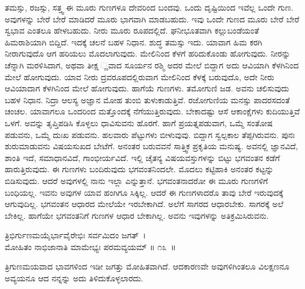 ತಮಸ್ಸು, ರಜಸ್ಸು, ಸತ್ತ್ವ ಈ ಮೂರು ಗುಣಗಳೂ ದೇವರಿಂದ ಬಂದವು. ಒಂದು ದೃಷ್ಟಿಯಿಂದ ಇವೆಲ್ಲ ಒಂದೇ ಗುಣ. ಅವುಗಳನ್ನು ಬೇರೆ ಬೇರೆ ಮಾಡಿದರೆ ಮೂರು ಭಾಗವಾಗಿ ಮಾಡಬಹುದು. ಇವು ಒಂದೇ ಗುಣದ ಮೂರು ಬೇರೆ ಬೇರೆ ಸ್ವಭಾವ ಎಂತಲೂ ಹೇಳಬಹುದು. ನೀರು ಮೂರು ರೂಪದಲ್ಲಿದೆ. ಘನೀಭೂತವಾಗಿ ಕಲ್ಲುಬಂಡೆಯಂತೆ ಹಿಮರಾಶಿಯಾಗಿ ಬಿದ್ದಿದೆ. ಇದಕ್ಕೆ ಚಲನೆ ಬಹಳ ನಿಧಾನ. ಶುದ್ಧ ತಮಸ್ಸು ಇದು. ಯಾವಾಗ ಹಿಮ ಕರಗಿ ನೀರಾಗುವುದೊ ಆಗ ಹರಿಯಲು ಮೊದಲಾಗುವುದು. ಮೇಲಿನಿಂದ ಕೆಳಗೆ ಹರಿದುಕೊಂಡು ಹೋಗುವುದು. ನೀರನ್ನು ಚೆನ್ನಾಗಿ ಮರಳಿಸಿದಾಗ, ಅಥವಾ ತೀಕ್ಷ ್ಣವಾದ ಸೂರ್ಯನ ರಶ್ಮಿ ಅದರ ಮೇಲೆ ಬಿದ್ದಾಗ ಅದು ಆವಿಯಾಗಿ ಕೆಳಗಿನಿಂದ ಮೇಲೆ ಹೋಗುವುದು. ಯಾವ ನೀರು ದ್ರವರೂಪದಲ್ಲಿರುವಾಗ ಮೇಲಿನಿಂದ ಕೆಳಕ್ಕೆ ಬರುವುದೊ, ಅದೇ ನೀರು ಆವಿಯಾದಾಗ ಕೆಳಗಿನಿಂದ ಮೇಲೆ ಹೋಗುವುದು. ಹಾಗೆಯೆ ಗುಣಗಳು. ತಮೋಗುಣಿ ಜಡ. ಅವನು ಚಲಿಸುವುದು ಬಹಳ ನಿಧಾನ. ನಿದ್ರಾ ಆಲಸ್ಯ ಅಜ್ಞಾನ ಮೋಹ ತುಂಬಿ ತುಳುಕಾಡುತ್ತಿವೆ. ರಜೋಗುಣಿಯ ಮನಸ್ಸು ಪಾದರಸದಂತೆ ಚಂಚಲ. ಯಾವಾಗಲೂ ಒಂದರಿಂದ ಮತ್ತೊಂದಕ್ಕೆ ನೆಗೆಯುತ್ತಿರುವುದು. ಬೇಕಾದಷ್ಟು ಆಸೆ ಆಕಾಂಕ್ಷೆಗಳು ಕುದಿಯುತ್ತಿವೆ ಒಳಗೆ. ಅವನ್ನು ತೃಪ್ತಿಪಡಿಸಿ ಕೊಳ್ಳಲು ಧಾವಿಸುವನು ಹೊರಗೆ. ಹಾಗೆ ಪ್ರಯತ್ನಪಡುವಾಗ, ಒಮ್ಮೆ ಸಂತೋಷ ಪಡುವನು, ಒಮ್ಮೆ ದುಃಖ ಪಡುವನು. ಹಲವಾರು ಪೆಟ್ಟುಗಳು ಬೀಳುವುವು. ಬಿದ್ದಾಗ ಸ್ವಲ್ಪಕಾಲ ತೆಪ್ಪಗಿರುವನು. ಪುನಃ ಶುರುಮಾಡುವನು ವಿಷಯಸುಖದ ಬೇಟೆಗೆ. ಅನಂತರ ಬರುವವನೆ ಸಾತ್ತ್ವಿಕ ಪ್ರಕೃತಿಯ ಮನುಷ್ಯ. ಅವನಲ್ಲಿ ಜ್ಞಾನವಿದೆ, ಶಾಂತಿ ಇದೆ, ಸಮಾಧಾನವಿದೆ, ಗಾಂಭೀರ್ಯವಿದೆ. ಇಲ್ಲಿ ಚೈತನ್ಯ ವಿಷಯವಸ್ತುಗಳನ್ನು ಬಿಟ್ಟು ಭಗವಂತನ ಕಡೆಗೆ ಹಾರುತ್ತಿರುವುದು. ಈ ಗುಣಗಳು ಬಂದಿರುವುದು ಭಗವಂತನಿಂದಲೇ. ಮೊದಲು ಕಟ್ಟಿಹಾಕಿ ಅನಂತರ ಕಟ್ಟನ್ನು ಬಿಡಿಸುವುದು. ಆದರೆ ಅವುಗಳಲ್ಲಿ ನಾನು ಇಲ್ಲಾ ಎನ್ನುತ್ತಾನೆ. ಭಗವಂತನಾದರೋ ಈ ಮೂರು ಗುಣಗಳಿಗೆ ಬಂಧಿಯಲ್ಲ. ಇವನು ಅವುಗಳ ಯಾವ ಹಂಗಿಗೂ ಸಿಕ್ಕಿಲ್ಲ. ಆದರೆ ಈ ಗುಣಗಳಾದರೊ ತಾವು ಬೇರೆ ಇರುವುದಕ್ಕೆ ಆಗುವುದಿಲ್ಲ. ಭಗವಂತನ ಆಧಾರದ ಮೇಲೆಯೇ ಇರಬೇಕಾಗಿದೆ. ಅಲೆಗೆ ಸಾಗರದ ಆಧಾರಬೇಕು. ಸಾಗರಕ್ಕೆ ಅಲೆ ಬೇಕಿಲ್ಲ. ಹಾಗೆಯೇ ಭಗವಂತನಿಗೆ ಗುಣಗಳ ಆಧಾರ ಬೇಕಾಗಿಲ್ಲ. ಅವನು ಇವುಗಳನ್ನು ಅತಿಕ್ರಮಿಸಿರುವನು.

\begin{shloka}
 ತ್ರಿಭಿರ್ಗುಣಮಯೈರ್ಭಾವೈರೇಭಿಃ ಸರ್ವಮಿದಂ ಜಗತ್~।\\ಮೋಹಿತಂ ನಾಭಿಜಾನಾತಿ ಮಾಮೇಭ್ಯಃ ಪರಮವ್ಯಯಮ್ \hfill॥ ೧೩~॥
\end{shloka}

\begin{artha}
ತ್ರಿಗುಣಮಯವಾದ ಭಾವಗಳಿಂದ ಇಡೀ ಜಗತ್ತು ಮೋಹಿತವಾಗಿದೆ. ಆದಕಾರಣವೇ ಅವುಗಳಿಗಿಂತಲೂ ವಿಲಕ್ಷಣನೂ ಅವ್ಯಯನೂ ಆದ ನನ್ನನ್ನು ಅದು ತಿಳಿದುಕೊಳ್ಳಲಾರದು.
\end{artha}

